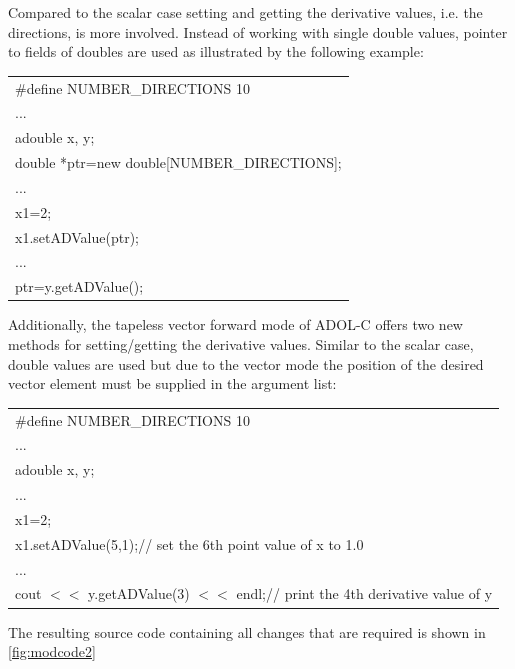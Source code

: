 \documentclass[11pt,twoside]{article}
\begin{document}
Compared to the scalar case setting and getting the derivative
values, i.e. the directions, is more involved. Instead of
working with single {\sf double} values, pointer to fields of {\sf
double}s are used as illustrated by the following example: 
\begin{center}
  \begin{tabular}{l}
    {\sf \#define NUMBER\_DIRECTIONS 10}\\
    ...\\
    {\sf adouble x, y;}\\
    {\sf double *ptr=new double[NUMBER\_DIRECTIONS];}\\
      ...\\
    {\sf x1=2;}\\
    {\sf x1.setADValue(ptr);}\\
    ...\\
    {\sf ptr=y.getADValue();}
  \end{tabular}
\end{center}
Additionally, the tapeless vector forward mode of ADOL-C offers two
new methods for setting/getting the derivative values. Similar
to the scalar case, {\sf double} values are used but due to the vector
mode the position of the desired vector element must be supplied in
the argument list:
\begin{center}
  \begin{tabular}{l}
    {\sf \#define NUMBER\_DIRECTIONS 10}\\
    ...\\
    {\sf adouble x, y;}\\
    ...\\
    {\sf x1=2;}\\
    {\sf x1.setADValue(5,1);\hspace*{3.7cm}// set the 6th point value of x to 1.0}\\
      ...\\
    {\sf cout $<<$ y.getADValue(3) $<<$ endl;\hspace*{1cm}// print the 4th derivative value of y}
  \end{tabular}
\end{center}
The resulting source code containing all changes that are required is
shown in \autoref{fig:modcode2}
\end{document}
